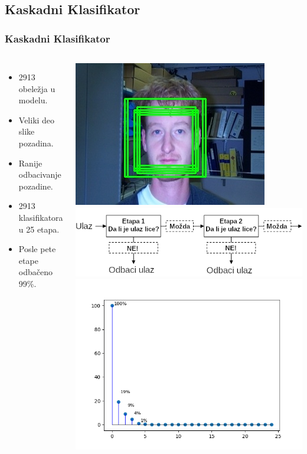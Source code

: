 \documentclass{beamer}
\begin{document}
\subsection{Kaskadni Klasifikator}
\begin{frame}
  \frametitle{Kaskadni Klasifikator}

  \begin{columns}[onlytextwidth,T]
    \column{\dimexpr\linewidth-60mm-2mm}
  \begin{itemize}
  \item<1-> 2913 obeležja u modelu.
  \item<1-> Veliki deo slike pozadina.
  \item<2-> Ranije odbacivanje pozadine.
  \item<2-> 2913 klasifikatora u 25 etapa.
  \item<3-> Posle pete etape odbačeno 99\%.
  \end{itemize}


  \column{80mm}
  \begin{overprint}
    \includegraphics[width=0.7\linewidth]{../images/rotation_variance}
    \includegraphics[width=0.9\linewidth]{../images/cascade_classifier1}
    \includegraphics[width=0.9\linewidth]{../images/cascade_classifier2}
  \end{overprint}


\end{columns}
\end{frame}
\end{document}
